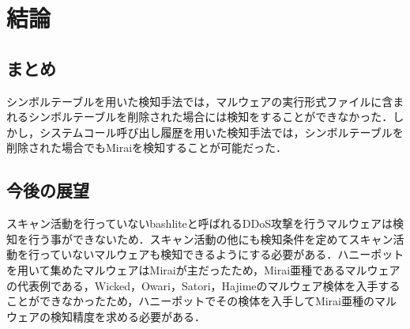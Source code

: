 \chapter{結論}

\section{まとめ}

シンボルテーブルを用いた検知手法では，マルウェアの実行形式ファイルに含まれるシンボルテーブルを削除された場合には検知をすることができなかった．しかし，システムコール呼び出し履歴を用いた検知手法では，シンボルテーブルを削除された場合でもMiraiを検知することが可能だった．

\section{今後の展望}
スキャン活動を行っていないbashliteと呼ばれるDDoS攻撃を行うマルウェアは検知を行う事ができないため．スキャン活動の他にも検知条件を定めてスキャン活動を行っていないマルウェアも検知できるようにする必要がある．ハニーポットを用いて集めたマルウェアはMiraiが主だったため，Mirai亜種であるマルウェアの代表例である，Wicked，Owari，Satori，Hajimeのマルウェア検体を入手することができなかったため，ハニーポットでその検体を入手してMirai亜種のマルウェアの検知精度を求める必要がある．
